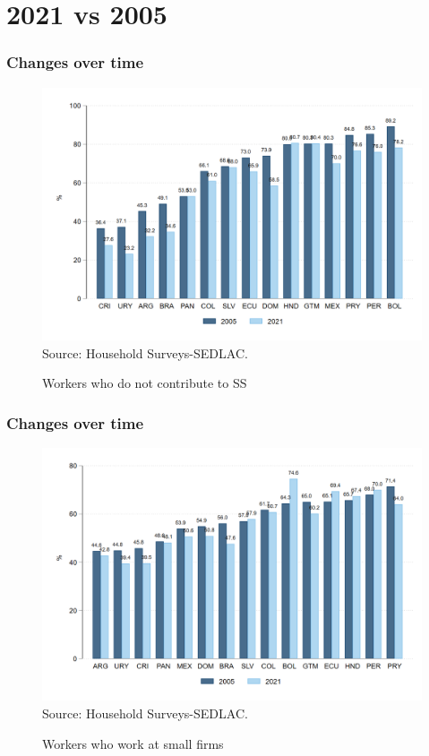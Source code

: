 \documentclass{beamer}
\begin{document}
\section{2021 vs 2005}


\begin{frame}
\frametitle{Changes over time}
\begin{figure}[!htb]
    \justifying
     \caption{Workers who do not contribute to SS}     
     \includegraphics[width=0.8\linewidth]{latex/figures/Snapshot/snapshot_informal_ss.png}
    \label{fig:SalariedSS}
    \centering
    \footnotesize{Source: Household Surveys-SEDLAC.}
\end{figure}
    
\end{frame}


\begin{frame}
\frametitle{Changes over time}
\begin{figure}[!htb]
    \justifying
     \caption{Workers who work at small firms}     
     \includegraphics[width=0.8\linewidth]{latex/figures/Snapshot/snapshot_workers_small.png}
    \label{fig:SalariedSmall}
    \centering
    \footnotesize{Source: Household Surveys-SEDLAC.}
\end{figure}
\end{frame}
\end{document}
